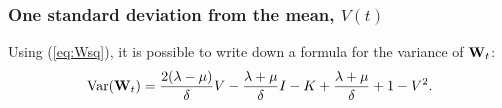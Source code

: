 \subsubsection{One standard deviation from the mean, $V(t)$}

Using (\ref{eq:Wsq}), it is possible to write down a formula for the variance
of ${{\bf W}_t}$:
\begin{equation}
\label{VarY}
\text{Var}({{\bf W}_t}) = \frac{2(\lambda-\mu)}{\delta} V -\frac{\lambda+\mu}{\delta}I -K +\frac{\lambda+\mu}{\delta}+1 - V^2.
\end{equation}

